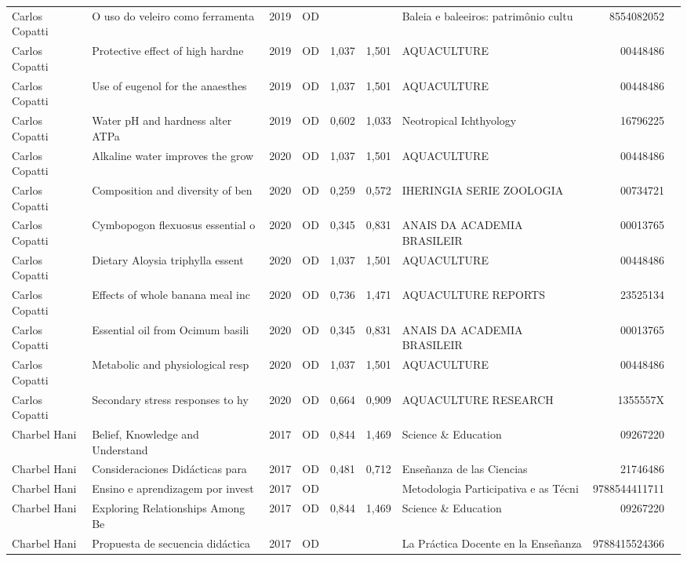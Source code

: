 \documentclass[12pt,brazil]{article}\usepackage[]{graphicx}\usepackage[]{xcolor}
\begin{document}
\begin{longtable}{lllrrllrr}
Carlos Copatti & O uso do veleiro como ferramenta & 2019 & OD &  &  & Baleia e baleeiros: patrimônio cultu & 8554082052 \\
Carlos Copatti & Protective effect of high hardne & 2019 & OD & 1,037 & 1,501 & AQUACULTURE & 00448486 \\
Carlos Copatti & Use of eugenol for the anaesthes & 2019 & OD & 1,037 & 1,501 & AQUACULTURE & 00448486 \\
Carlos Copatti & Water pH and hardness alter ATPa & 2019 & OD & 0,602 & 1,033 & Neotropical Ichthyology & 16796225 \\
Carlos Copatti & Alkaline water improves the grow & 2020 & OD & 1,037 & 1,501 & AQUACULTURE & 00448486 \\
Carlos Copatti & Composition and diversity of ben & 2020 & OD & 0,259 & 0,572 & IHERINGIA SERIE ZOOLOGIA & 00734721 \\
Carlos Copatti & Cymbopogon flexuosus essential o & 2020 & OD & 0,345 & 0,831 & ANAIS DA ACADEMIA BRASILEIR & 00013765 \\
Carlos Copatti & Dietary Aloysia triphylla essent & 2020 & OD & 1,037 & 1,501 & AQUACULTURE & 00448486 \\
Carlos Copatti & Effects of whole banana meal inc & 2020 & OD & 0,736 & 1,471 & AQUACULTURE REPORTS & 23525134 \\
Carlos Copatti & Essential oil from Ocimum basili & 2020 & OD & 0,345 & 0,831 & ANAIS DA ACADEMIA BRASILEIR & 00013765 \\
Carlos Copatti & Metabolic and physiological resp & 2020 & OD & 1,037 & 1,501 & AQUACULTURE & 00448486 \\
Carlos Copatti & Secondary stress responses to hy & 2020 & OD & 0,664 & 0,909 & AQUACULTURE RESEARCH & 1355557X \\
Charbel Hani & Belief, Knowledge and Understand & 2017 & OD & 0,844 & 1,469 & Science \& Education & 09267220 \\
Charbel Hani & Consideraciones Didácticas para  & 2017 & OD & 0,481 & 0,712 & Enseñanza de las Ciencias & 21746486 \\
Charbel Hani & Ensino e aprendizagem por invest & 2017 & OD &  &  & Metodologia Participativa e as Técni & 9788544411711 \\
Charbel Hani & Exploring Relationships Among Be & 2017 & OD & 0,844 & 1,469 & Science \& Education & 09267220 \\
Charbel Hani & Propuesta de secuencia didáctica & 2017 & OD &  &  & La Práctica Docente en la Enseñanza  & 9788415524366 \\

\end{longtable}
\end{document}

